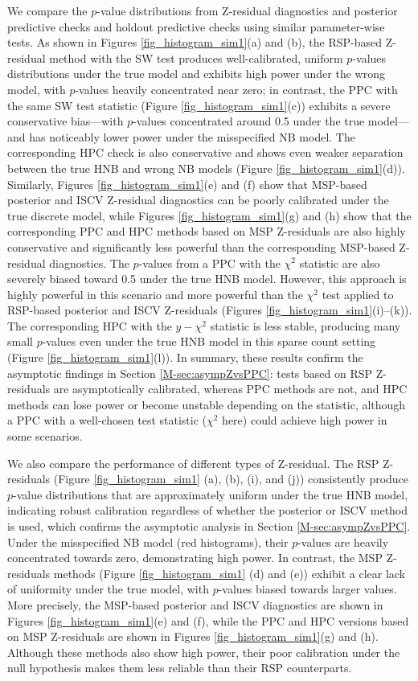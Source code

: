 \documentclass[
  12pt]{article}
\theoremstyle{plain}
\theoremstyle{definition}
\theoremstyle{remark}
\begin{document}
We compare the $p$-value distributions from Z-residual diagnostics and posterior predictive checks and holdout predictive checks using similar parameter-wise tests. As shown in Figures \ref{fig_histogram_sim1}(a) and (b), the RSP-based Z-residual method with the SW test produces well-calibrated, uniform $p$-values distributions under the true model and exhibits high power under the wrong model, with $p$-values heavily concentrated near zero; in contrast, the PPC with the same SW test statistic (Figure \ref{fig_histogram_sim1}(c)) exhibits a severe conservative bias---with $p$-values concentrated around 0.5 under the true model---and has noticeably lower power under the misspecified NB model. The corresponding HPC check is also conservative and shows even weaker separation between the true HNB and wrong NB models (Figure \ref{fig_histogram_sim1}(d)). Similarly, Figures \ref{fig_histogram_sim1}(e) and (f) show that MSP-based posterior and ISCV Z-residual diagnostics can be poorly calibrated under the true discrete model, while Figures \ref{fig_histogram_sim1}(g) and (h) show that the corresponding PPC and HPC methods based on MSP Z-residuals are also highly conservative and significantly less powerful than the corresponding MSP-based Z-residual diagnostics. The $p$-values from a PPC with the $\chi^2$ statistic are also severely biased toward 0.5 under the true HNB model. However, this approach is highly powerful in this scenario and more powerful than the $\chi^2$ test applied to RSP-based posterior and ISCV Z-residuals (Figures \ref{fig_histogram_sim1}(i)--(k)). The corresponding HPC with the $y-\chi^2$ statistic is less stable, producing many small $p$-values even under the true HNB model in this sparse count setting (Figure \ref{fig_histogram_sim1}(l)). In summary, these results confirm the asymptotic findings in Section \ref{M-sec:asympZvsPPC}: tests based on RSP Z-residuals are asymptotically calibrated, whereas PPC methods are not, and HPC methods can lose power or become unstable depending on the statistic, although a PPC with a well-chosen test statistic ($\chi^2$ here) could achieve high power in some scenarios.

We also compare the performance of different types of Z-residual. The RSP Z-residuals (Figure \ref{fig_histogram_sim1} (a), (b), (i), and (j)) consistently produce $p$-value distributions that are approximately uniform under the true HNB model, indicating robust calibration regardless of whether the posterior or ISCV method is used, which confirms the asymptotic analysis in Section \ref{M-sec:asympZvsPPC}. Under the misspecified NB model (red histograms), their $p$-values are heavily concentrated towards zero, demonstrating high power. In contrast, the MSP Z-residuals methods (Figure \ref{fig_histogram_sim1} (d) and (e)) exhibit a clear lack of uniformity under the true model, with $p$-values biased towards larger values. More precisely, the MSP-based posterior and ISCV diagnostics are shown in Figures \ref{fig_histogram_sim1}(e) and (f), while the PPC and HPC versions based on MSP Z-residuals are shown in Figures \ref{fig_histogram_sim1}(g) and (h). Although these methods also show high power, their poor calibration under the null hypothesis makes them less reliable than their RSP counterparts.
\end{document}

